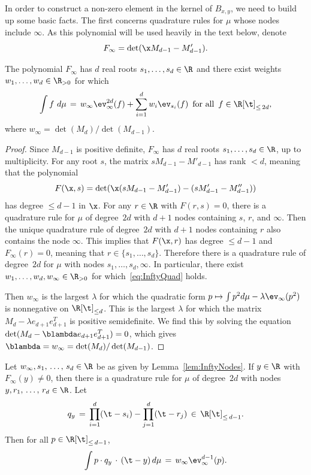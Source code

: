 In order to construct a non-zero element in the kernel of $B_{x,y}$, we need to build up some basic facts. The first concerns quadrature rules for $\mu$ whose nodes include $\infty$. As this polynomial will be used heavily in the text below, denote
\[
F_{\infty} = \det(\x M_{d-1} -M_{d-1}').
\]


\begin{lemm}\label{lem:InftyNodes}
The polynomial $F_{\infty}$ has $d$ real roots $s_1, \hdots, s_d \in \R$ and there exist weights $w_1, \hdots, w_d\in \R_{> 0}$ for which
\begin{equation}\label{eq:InftyQuad}
\int f \ d\mu \, = \, w_{\infty} \ev_{\infty}^{2d}(f) + \sum_{i=1}^d w_i \ev_{s_i}(f) \, \text{ for all } \, f\in \R[\t]_{\leq\,2d},
\end{equation}
where $w_{\infty} = \det(M_d)/\det(M_{d-1})$.
\end{lemm}


\begin{proof}
Since $M_{d-1}$ is positive definite, $F_{\infty}$ has $d$ real roots $s_1, \hdots, s_d\in \R$, up to multiplicity. For any root $s$, the matrix $sM_{d-1} - M'_{d-1}$ has rank $<d$, meaning that the polynomial
\[
F(\x,s) = \det(\x(sM_{d-1} - M'_{d-1}) - (sM'_{d-1} -M_{d-1}''))
\]
has degree $\leq d-1$ in $\x$. For any $r\in \R$ with $F(r,s)=0$, there is a quadrature rule for $\mu$ of degree~$2d$ with $d+1$ nodes containing $s$, $r$, and $\infty$. Then the unique quadrature rule of degree~$2d$ with $d+1$ nodes containing $r$ also contains the node $\infty$. This implies that $F(\x,r)$ has degree $\leq d-1$ and $F_\infty(r)=0$, meaning that $r\in \{s_1, \hdots, s_d\}$. Therefore there is a quadrature rule of degree~$2d$ for $\mu$ with nodes $s_1, \hdots, s_d, \infty$. In particular, there exist $w_1, \hdots, w_d, w_\infty\in \R_{>0}$ for which~\eqref{eq:InftyQuad} holds.

Then $w_\infty$ is the largest $\lambda$ for which the quadratic form $p \mapsto \int p^2 d\mu - \lambda \ev_{\infty}(p^2)$ is nonnegative on $\R[\t]_{\leq d}$. This is the largest $\lambda$ for which the matrix $M_d - \lambda e_{d+1}e_{d+1}^T$ is positive semidefinite. We find this by solving the equation $\det(M_d - \blambda e_{d+1}e_{d+1}^T) = 0$, which gives $\blambda = w_{\infty} = \det(M_d)/ \det(M_{d-1})$.
\end{proof}


\begin{lemm}\label{lem:kernel}
Let $w_{\infty}, s_1,\,\hdots,\,s_d\in \R$ be as given by Lemma~\ref{lem:InftyNodes}. If $y\in \R$ with $F_{\infty}(y)\neq 0$, then there is a quadrature rule for $\mu$ of degree~$2d$ with nodes $y, r_1,\,\hdots,\,r_d\in \R$. Let
\[
q_y \, = \, \prod_{i=1}^{d}(\t-s_i) - \prod_{j=1}^d(\t-r_j)\, \in \, \R[\t]_{\leq\, d-1}.
\]
Then for all $p\in \R[\t]_{\leq\,d-1}$,
\[
\int p \cdot q_y\,\cdot\,(\t-y) \, d\mu \, = \, w_\infty \ev^{d-1}_{\infty}(p).
\]
\end{lemm}


